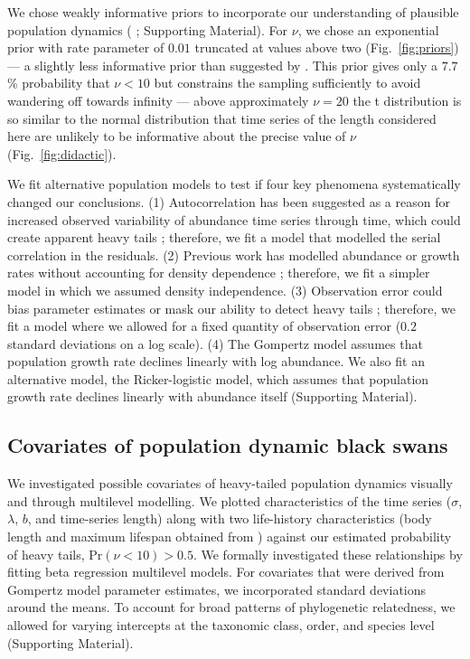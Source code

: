We chose weakly informative priors to incorporate our understanding of
plausible population dynamics 
(\citeauthor{gelman2014} \citeyear{gelman2014}; Supporting Material). 
For $\nu$, we chose an exponential prior with rate parameter of $0.01$ truncated at
values above two (Fig.~\ref{fig:priors}) --- a slightly less informative prior
than suggested by \citet{fernandez1998}. This prior gives only a $7.7$\%
probability that $\nu < 10$ but constrains the sampling sufficiently to avoid
wandering off towards infinity --- above approximately $\nu = 20$ the
t distribution is so similar to the normal distribution that time series of the
length considered here are unlikely to be informative about the precise value
of $\nu$ (Fig.~\ref{fig:didactic}).

We fit alternative population models to test if four key phenomena
systematically changed our conclusions. (1) Autocorrelation has been suggested
as a reason for increased observed variability of abundance time series through
time, which could create apparent heavy tails \citep{inchausti2002}; therefore,
we fit a model that modelled the serial correlation in the residuals. (2)
Previous work has modelled abundance or growth rates without accounting for
density dependence \citep{halley2002,segura2013}; therefore, we fit a simpler
model in which we assumed density independence. (3) Observation error could
bias parameter estimates \citep{knape2012} or mask our ability to detect heavy
tails \citep{ward2007}; therefore, we fit a model where we allowed for a fixed
quantity of observation error ($0.2$ standard deviations on a log scale). (4)
The Gompertz model assumes that population growth rate declines linearly with
log abundance. We also fit an alternative model, the Ricker-logistic model,
which assumes that population growth rate declines linearly with abundance
itself (Supporting Material).

\subsection{Covariates of population dynamic black swans}

We investigated possible covariates of heavy-tailed population dynamics
visually and through multilevel modelling. We plotted characteristics of the
time series ($\sigma$, $\lambda$, $b$, and time-series length) along with two
life-history characteristics (body length and maximum lifespan obtained from
\citet{brook2006a}) against our estimated probability of heavy tails, Pr$(\nu
< 10) > 0.5$. We formally investigated these relationships by fitting beta
regression multilevel models. For covariates that were derived from Gompertz
model parameter estimates, we incorporated standard deviations around the
means. To account for broad patterns of phylogenetic relatedness, we allowed
for varying intercepts at the taxonomic class, order, and species level
(Supporting Material).

